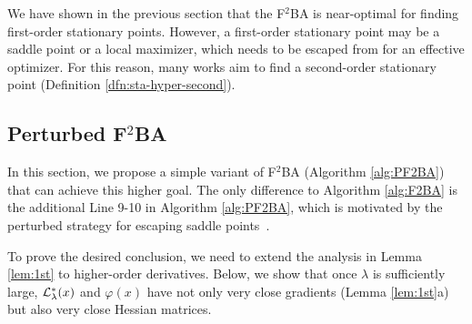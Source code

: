 \documentclass[twoside,11pt]{article}
\begin{document}
We have shown in the previous section that the F${}^2$BA is near-optimal for finding first-order stationary points. However, a first-order stationary point may be a saddle point or a local maximizer, which needs to be escaped from for an effective optimizer.
For this reason, many works aim to find a second-order stationary point (Definition \ref{dfn:sta-hyper-second}).

\subsection{Perturbed F${}^2$BA}
In this section, we propose a simple variant of F${}^2$BA (Algorithm \ref{alg:PF2BA}) that can achieve this higher goal. 
The only difference to Algorithm \ref{alg:F2BA} is the additional Line 9-10 in Algorithm \ref{alg:PF2BA}, which is motivated by the perturbed strategy for escaping saddle points~\citep{jin2017escape}.


To prove the desired conclusion, we need to extend the analysis in Lemma \ref{lem:1st}
to higher-order derivatives. Below, we show that once $\lambda$ is sufficiently large, ${\mathcal{L}}_{\lambda}^*(x)$ and $\varphi(x)$ have not only very close gradients (Lemma \ref{lem:1st}a) but also very close Hessian matrices. 

\end{document}
